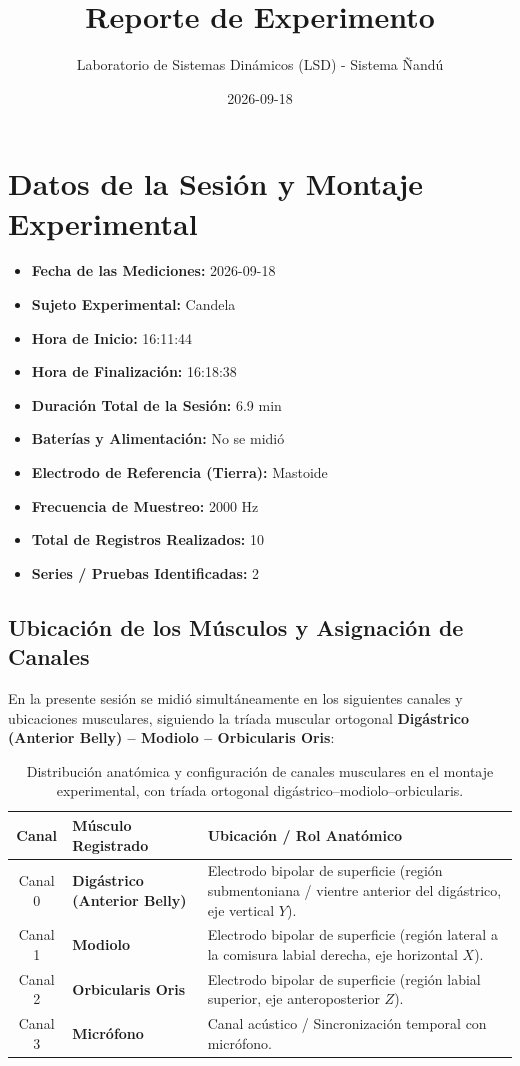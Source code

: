 \documentclass[11pt,a4paper]{article}
\title{\textbf{Reporte de Experimento}}
\author{Laboratorio de Sistemas Dinámicos (LSD) - Sistema Ñandú}
\date{2026-09-18}
\begin{document}
\maketitle

\section{Datos de la Sesión y Montaje Experimental}
\begin{itemize}
    \item \textbf{Fecha de las Mediciones:} 2026-09-18
    \item \textbf{Sujeto Experimental:} Candela
    \item \textbf{Hora de Inicio:} 16:11:44
    \item \textbf{Hora de Finalización:} 16:18:38
    \item \textbf{Duración Total de la Sesión:} 6.9 min
    \item \textbf{Baterías y Alimentación:} No se midió
    \item \textbf{Electrodo de Referencia (Tierra):} Mastoide
    \item \textbf{Frecuencia de Muestreo:} 2000 Hz
    \item \textbf{Total de Registros Realizados:} 10
    \item \textbf{Series / Pruebas Identificadas:} 2
\end{itemize}

\subsection{Ubicación de los Músculos y Asignación de Canales}
En la presente sesión se midió simultáneamente en los siguientes canales y ubicaciones musculares, siguiendo la tríada muscular ortogonal \textbf{Digástrico (Anterior Belly) -- Modiolo -- Orbicularis Oris}:
\begin{table}[H]
\centering
\begin{tabularx}{\textwidth}{c p{6.5cm} X}
\toprule
\textbf{Canal} & \textbf{Músculo Registrado} & \textbf{Ubicación / Rol Anatómico} \\
\midrule
Canal 0 & \textbf{Digástrico (Anterior Belly)} & Electrodo bipolar de superficie (región submentoniana / vientre anterior del digástrico, eje vertical $Y$). \\
Canal 1 & \textbf{Modiolo} & Electrodo bipolar de superficie (región lateral a la comisura labial derecha, eje horizontal $X$). \\
Canal 2 & \textbf{Orbicularis Oris} & Electrodo bipolar de superficie (región labial superior, eje anteroposterior $Z$). \\
Canal 3 & \textbf{Micrófono} & Canal acústico / Sincronización temporal con micrófono. \\
\bottomrule
\end{tabularx}
\caption{Distribución anatómica y configuración de canales musculares en el montaje experimental, con tríada ortogonal digástrico--modiolo--orbicularis.}
\end{table}
\end{document}
